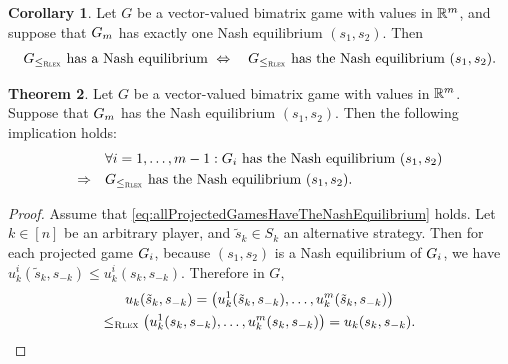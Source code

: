 \documentclass[a4paper,DIV=11]{scrreprt}
\theoremstyle{definition}
\newtheorem{thm}{Theorem}[chapter] %
\newtheorem{cor}[thm]{Corollary}
\begin{document}
    \begin{cor}
        Let $G$ be a vector-valued bimatrix game with values in $\mathbb{R}^m$, and suppose that  $G_{m}$ has exactly one Nash equilibrium $(s_1, s_2)$.
        Then
        \begin{gather*}
            G_{\leq_{\textsc{Rlex}}} \text{ has a Nash equilibrium } 
            \Leftrightarrow\quad G_{\leq_{\textsc{Rlex}}} \text{ has the Nash equilibrium } (s_1, s_2).   
        \end{gather*}
    \end{cor}

    \begin{thm}
        \label{thm:rlexGameProjectedGameSufficientCondition}
        Let $G$ be a vector-valued bimatrix game with values in $\mathbb{R}^m$.
        Suppose that $G_{m}$ has the 
        Nash equilibrium $(s_1, s_2)$.    
        Then the following implication holds:
        \begin{align}
            \label{eq:allProjectedGamesHaveTheNashEquilibrium}
                            &\forall i = 1, \dots, m-1: G_{i} \text{ has the Nash equilibrium } (s_1, s_2) \\
            \Rightarrow\quad &G_{\leq_{\textsc{Rlex}}} \text{ has the Nash equilibrium } (s_1, s_2).
        \end{align}
    \end{thm}
    \begin{proof}
        Assume that \eqref{eq:allProjectedGamesHaveTheNashEquilibrium} holds.
        Let $k \in [n]$ be an arbitrary player, and $\tilde{s}_k \in S_k$ an alternative strategy.
        Then for each projected game $G_{i}$, because $(s_1, s_2)$ is a Nash equilibrium of $G_{i}$, we have $u_k^{i}(\tilde{s}_k, s_{-k}) \leq u_k^{i}(s_k, s_{-k})$.
        Therefore in $G$,
        \begin{multline*}
            u_k(\tilde{s}_k, s_{-k}) 
            = \bigl(u_k^{1}(\tilde{s}_k, s_{-k}), \dots, u_k^{m}(\tilde{s}_k, s_{-k})\bigr) \\
            \leq_{\textsc{Rlex}} \bigl(u_k^{1}(s_k, s_{-k}), \dots, u_k^{m}(s_k, s_{-k})\bigr)
            = u_k(s_k, s_{-k}).
        \end{multline*}
    \end{proof}
\end{document}
